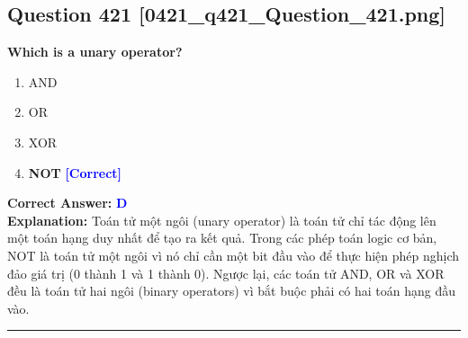 \documentclass[11pt,a4paper]{article}
\begin{document}
\begin{minipage}{\textwidth}
\subsection*{Question 421 \quad \footnotesize{[0421\_q421\_Question\_421.png]}}
\noindent \textbf{Which is a unary operator?}

\begin{enumerate}[label=\Alph*.]
    \item AND
    \item OR
    \item XOR
    \item \textbf{NOT} \hfill \textcolor{blue}{\textbf{[Correct]}}
\end{enumerate}

\noindent \textbf{Correct Answer:} \textcolor{blue}{\textbf{D}} \\[2pt]
\noindent \textbf{Explanation:} Toán tử một ngôi (unary operator) là toán tử chỉ tác động lên một toán hạng duy nhất để tạo ra kết quả. Trong các phép toán logic cơ bản, NOT là toán tử một ngôi vì nó chỉ cần một bit đầu vào để thực hiện phép nghịch đảo giá trị (0 thành 1 và 1 thành 0). Ngược lại, các toán tử AND, OR và XOR đều là toán tử hai ngôi (binary operators) vì bắt buộc phải có hai toán hạng đầu vào.

\par\vspace{0.3cm}
\hrule
\vspace{0.3cm}
\end{minipage}
\end{document}
